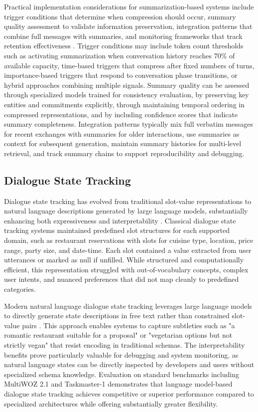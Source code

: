 Practical implementation considerations for summarization-based systems include trigger conditions that determine when compression should occur, summary quality assessment to validate information preservation, integration patterns that combine full messages with summaries, and monitoring frameworks that track retention effectiveness \citep{ibrahim2025strategies}. Trigger conditions may include token count thresholds such as activating summarization when conversation history reaches 70\% of available capacity, time-based triggers that compress after fixed numbers of turns, importance-based triggers that respond to conversation phase transitions, or hybrid approaches combining multiple signals. Summary quality can be assessed through specialized models trained for consistency evaluation, by preserving key entities and commitments explicitly, through maintaining temporal ordering in compressed representations, and by including confidence scores that indicate summary completeness. Integration patterns typically mix full verbatim messages for recent exchanges with summaries for older interactions, use summaries as context for subsequent generation, maintain summary histories for multi-level retrieval, and track summary chains to support reproducibility and debugging.

\subsection{Dialogue State Tracking}

Dialogue state tracking has evolved from traditional slot-value representations to natural language descriptions generated by large language models, substantially enhancing both expressiveness and interpretability \citep{feng2021dialogue}. Classical dialogue state tracking systems maintained predefined slot structures for each supported domain, such as restaurant reservations with slots for cuisine type, location, price range, party size, and date-time. Each slot contained a value extracted from user utterances or marked as null if unfilled. While structured and computationally efficient, this representation struggled with out-of-vocabulary concepts, complex user intents, and nuanced preferences that did not map cleanly to predefined categories.

Modern natural language dialogue state tracking leverages large language models to directly generate state descriptions in free text rather than constrained slot-value pairs \citep{feng2021dialogue}. This approach enables systems to capture subtleties such as "a romantic restaurant suitable for a proposal" or "vegetarian options but not strictly vegan" that resist encoding in traditional schemas. The interpretability benefits prove particularly valuable for debugging and system monitoring, as natural language states can be directly inspected by developers and users without specialized schema knowledge. Evaluation on standard benchmarks including MultiWOZ 2.1 and Taskmaster-1 demonstrates that language model-based dialogue state tracking achieves competitive or superior performance compared to specialized architectures while offering substantially greater flexibility.

